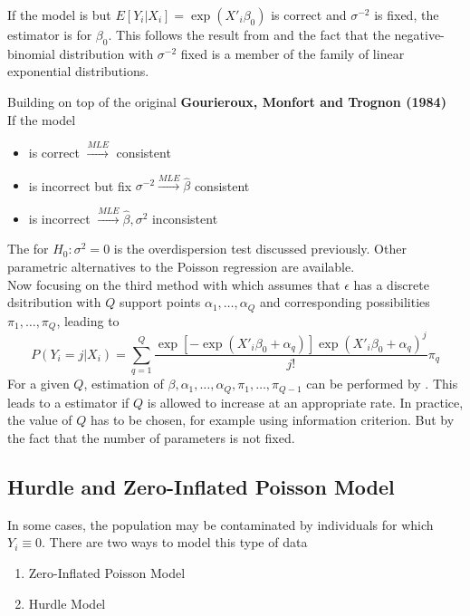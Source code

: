 If the model is  but $E[Y_i|X_i] = \exp(X'_i\beta_0)$ is correct and $\sigma^{-2}$ is fixed, the  estimator is  for $\beta_0$.
This follows the result from  and the fact that the negative-binomial distribution with $\sigma^{-2}$ fixed is a member of the family of linear exponential distributions.
\begin{lemma} Building on top of the original \textbf{Gourieroux, Monfort and Trognon (1984)}\\
    If the model
    \begin{itemize}
        \item is correct $\xrightarrow{MLE}$ consistent
        \item is incorrect but fix $\sigma^{-2}\xrightarrow{MLE} \hat{\beta}$ consistent
        \item is incorrect $\xrightarrow{MLE} \hat{\beta}, \sigma^2$ inconsistent
    \end{itemize}
\end{lemma}
The  for $H_0:\sigma^2=0$ is the overdispersion test discussed previously. Other parametric alternatives to the Poisson regression are available.\\

Now focusing on the third method with  which assumes that $\epsilon$ has a discrete dsitribution with $Q$ support points 
$\alpha_1,\ldots,\alpha_Q$ and corresponding possibilities $\pi_1,\ldots,\pi_Q$, leading to 
\begin{equation}
    P(Y_i=j|X_i) = \sum_{q=1}^{Q}\frac{\exp[-\exp(X'_i\beta_0+\alpha_q)]\exp(X'_i\beta_0+\alpha_q)^j}{j!}\pi_q
\end{equation}
For a given $Q$, estimation of $\beta, \alpha_1,\ldots,\alpha_Q,\pi_1,\ldots,\pi_{Q-1}$ can be performed by .
This leads to a  estimator if $Q$ is allowed to increase at an appropriate rate.
In practice, the value of $Q$ has to be chosen, for example using information criterion.
But  by the fact that the number of parameters is not fixed.

\subsection{Hurdle and Zero-Inflated Poisson Model}
In some cases, the population may be contaminated by individuals for which $Y_i\equiv 0$. There are two ways to model this type of data 
\begin{enumerate}
    \item Zero-Inflated Poisson Model
    \item Hurdle Model
\end{enumerate}

